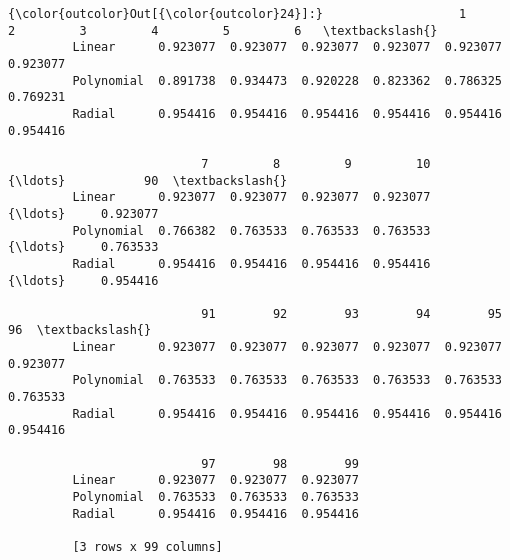\documentclass[11pt]{article}
\begin{document}
\begin{Verbatim}[commandchars=\\\{\}]
{\color{outcolor}Out[{\color{outcolor}24}]:}                   1         2         3         4         5         6   \textbackslash{}
         Linear      0.923077  0.923077  0.923077  0.923077  0.923077  0.923077   
         Polynomial  0.891738  0.934473  0.920228  0.823362  0.786325  0.769231   
         Radial      0.954416  0.954416  0.954416  0.954416  0.954416  0.954416   
         
                           7         8         9         10    {\ldots}           90  \textbackslash{}
         Linear      0.923077  0.923077  0.923077  0.923077    {\ldots}     0.923077   
         Polynomial  0.766382  0.763533  0.763533  0.763533    {\ldots}     0.763533   
         Radial      0.954416  0.954416  0.954416  0.954416    {\ldots}     0.954416   
         
                           91        92        93        94        95        96  \textbackslash{}
         Linear      0.923077  0.923077  0.923077  0.923077  0.923077  0.923077   
         Polynomial  0.763533  0.763533  0.763533  0.763533  0.763533  0.763533   
         Radial      0.954416  0.954416  0.954416  0.954416  0.954416  0.954416   
         
                           97        98        99  
         Linear      0.923077  0.923077  0.923077  
         Polynomial  0.763533  0.763533  0.763533  
         Radial      0.954416  0.954416  0.954416  
         
         [3 rows x 99 columns]
\end{Verbatim}
            
\end{document}
